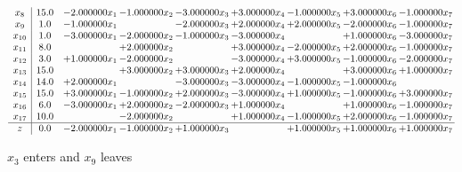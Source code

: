 \documentclass[10pt]{article}
\begin{document}
\[\begin{array}{c| c c@{\hskip 2pt} c@{\hskip 2pt} c@{\hskip 2pt} c@{\hskip 2pt} c@{\hskip 2pt} c@{\hskip 2pt} c@{\hskip 2pt} }
 x_{8}   &  15.0 & -2.000000 x_{1} & -1.000000 x_{2} & -3.000000 x_{3} & + 3.000000 x_{4} & -1.000000 x_{5} & + 3.000000 x_{6} & -1.000000 x_{7}\\
 x_{9}   &  1.0 & -1.000000 x_{1} &   & -2.000000 x_{3} & + 2.000000 x_{4} & + 2.000000 x_{5} & -2.000000 x_{6} & -1.000000 x_{7}\\
 x_{10}   &  1.0 & -3.000000 x_{1} & -2.000000 x_{2} & -1.000000 x_{3} & -3.000000 x_{4} &   & + 1.000000 x_{6} & -3.000000 x_{7}\\
 x_{11}   &  8.0  &   & + 2.000000 x_{2} &   & + 3.000000 x_{4} & -2.000000 x_{5} & + 2.000000 x_{6} & -1.000000 x_{7}\\
 x_{12}   &  3.0 & + 1.000000 x_{1} & -2.000000 x_{2} &   & -3.000000 x_{4} & + 3.000000 x_{5} & -1.000000 x_{6} & -2.000000 x_{7}\\
 x_{13}   &  15.0  &   & + 3.000000 x_{2} & + 3.000000 x_{3} & + 2.000000 x_{4} &   & + 3.000000 x_{6} & + 1.000000 x_{7}\\
 x_{14}   &  14.0 & + 2.000000 x_{1} &   & -3.000000 x_{3} & -3.000000 x_{4} & -1.000000 x_{5} & -1.000000 x_{6} &   \\
 x_{15}   &  15.0 & + 3.000000 x_{1} & -1.000000 x_{2} & + 2.000000 x_{3} & -3.000000 x_{4} & + 1.000000 x_{5} & -1.000000 x_{6} & + 3.000000 x_{7}\\
 x_{16}   &  6.0 & -3.000000 x_{1} & + 2.000000 x_{2} & -2.000000 x_{3} & + 1.000000 x_{4} &   & + 1.000000 x_{6} & -1.000000 x_{7}\\
 x_{17}   &  10.0  &   & -2.000000 x_{2} &   & + 1.000000 x_{4} & -1.000000 x_{5} & + 2.000000 x_{6} & -1.000000 x_{7}\\
\hline
z    &  0.0 & -2.000000 x_{1} & -1.000000 x_{2} & + 1.000000 x_{3} &   & + 1.000000 x_{5} & + 1.000000 x_{6} & + 1.000000 x_{7}\\
\end{array}\]


 $ x_{3} $ enters and $ x_{9} $ leaves 
\end{document}
